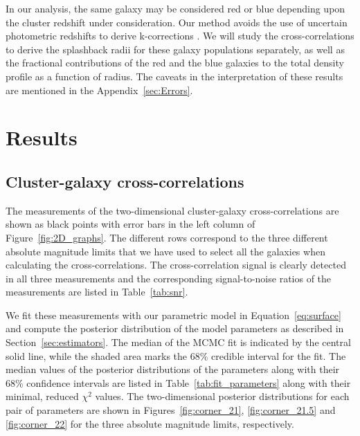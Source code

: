 \documentclass[iop, apjl, twocolappendix, numberedappendix]{emulateapj}
\begin{document}
In our analysis, the same galaxy may be considered red or blue depending upon
the cluster redshift under consideration. Our method avoids the use of
uncertain photometric redshifts to derive k-corrections
\citep[cf.][]{baxter2017halo}. We will study the cross-correlations to derive
the splashback radii for these galaxy populations separately, as well as the
fractional contributions of the red and the blue galaxies to the total density
profile as a function of radius. The caveats in the interpretation of these
results are mentioned in the Appendix~\ref{sec:Errors}.

\section{Results}
\label{sec:Results}
\subsection{Cluster-galaxy cross-correlations}
The measurements of the two-dimensional cluster-galaxy
cross-correlations are shown as black points with error bars in the
left column of Figure~\ref{fig:2D_graphs}. The different rows
correspond to the three different absolute magnitude limits that we
have used to select all the galaxies when calculating the
cross-correlations. The cross-correlation signal is clearly detected
in all three measurements and the corresponding signal-to-noise
ratios of the measurements are listed in Table~\ref{tab:snr}.

We fit these measurements with our parametric model in Equation~\ref{eq:surface}
and compute the posterior distribution of the model parameters 
as described in Section~\ref{sec:estimators}. The
median of the MCMC fit is indicated by the central solid line, while
the shaded area marks the 68\% credible interval for the fit. The
median values of the posterior distributions of the parameters along
with their 68\% confidence intervals are listed in
Table~\ref{tab:fit_parameters} along with their minimal, reduced
$\chi^2$ values. The two-dimensional posterior distributions for
each pair of parameters are shown in Figures~\ref{fig:corner_21},
\ref{fig:corner_21.5} and \ref{fig:corner_22} for the three absolute
magnitude limits, respectively.
\end{document}
